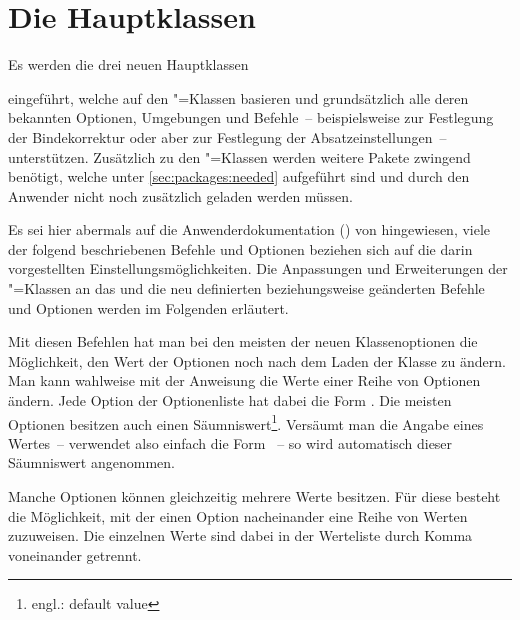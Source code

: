 \documentclass[%
  english,ngerman,%
  headings=optiontoheadandtoc,captions=tableheading,numbers=noenddot,%
  chapterpage,cdfoot,%
]{tudscrman}
\begin{document}
\chapter[Die Hauptklassen tudscrbook, tudscrreprt, tudscrartcl]{Die Hauptklassen}
Es werden die drei neuen Hauptklassen
%
\begin{description}
\item {}
\item {}
\item {}
\end{description}
%
eingeführt, welche auf den \KOMAScript"=Klassen basieren und grundsätzlich alle
deren bekannten Optionen, Umgebungen und Befehle~-- beispielsweise
 zur Festlegung der Bindekorrektur oder aber 
zur Festlegung der Absatzeinstellungen~-- unterstützen. Zusätzlich zu den 
\KOMAScript"=Klassen werden weitere Pakete zwingend benötigt, welche unter 
\autoref{sec:packages:needed} aufgeführt sind und durch den Anwender nicht noch 
zusätzlich geladen werden müssen.

Es sei hier abermals auf die Anwenderdokumentation () von 
\KOMAScript{} hingewiesen, viele der folgend beschriebenen Befehle und Optionen 
beziehen sich auf die darin vorgestellten Einstellungsmöglichkeiten. Die 
Anpassungen und Erweiterungen der \KOMAScript"=Klassen an das \CD und die neu 
definierten beziehungsweise geänderten Befehle und Optionen werden im Folgenden 
erläutert.

\begin{Declaration}{}
\begin{Declaration}{}
\printdeclarationlist%
%
%
Mit diesen Befehlen hat man bei den meisten der neuen Klassenoptionen die 
Möglichkeit, den Wert der Optionen noch nach dem Laden der Klasse zu ändern.
Man kann wahlweise mit der Anweisung  die Werte einer Reihe 
von Optionen ändern. Jede Option der Optionenliste hat dabei die Form
\PValue{=}. Die meisten Optionen besitzen auch einen 
Säumniswert\footnote{engl.: default value}. Versäumt man die Angabe eines 
Wertes~-- verwendet also einfach die Form ~-- so wird automatisch 
dieser Säumniswert angenommen.

Manche Optionen können gleichzeitig mehrere Werte besitzen. Für diese besteht 
die Möglichkeit, mit  der einen Option nacheinander eine 
Reihe von Werten zuzuweisen. Die einzelnen Werte sind dabei in der Werteliste 
durch Komma voneinander getrennt.
\end{Declaration}
\end{Declaration}
\end{document}
